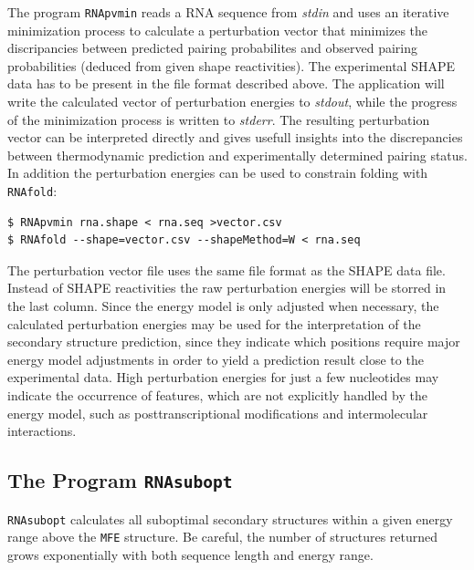 \documentclass[a4paper]{article}
\begin{document}
The program \texttt{RNApvmin} reads a RNA sequence from \textit{stdin} and uses an iterative minimization
process to calculate a perturbation vector that minimizes the discripancies
between predicted pairing probabilites and observed pairing probabilities
(deduced from given shape reactivities).
The experimental SHAPE data has to be present in the file format described above.
The application will write the calculated vector of perturbation energies to \textit{stdout},
while the progress of the minimization process is written to \textit{stderr}.
The resulting perturbation vector can be interpreted directly and gives usefull insights into the
discrepancies between thermodynamic prediction and experimentally determined pairing status.
In addition the perturbation energies can be used to constrain folding with \texttt{RNAfold}:

\begin{verbatim}
$ RNApvmin rna.shape < rna.seq >vector.csv
$ RNAfold --shape=vector.csv --shapeMethod=W < rna.seq
\end{verbatim}%

The perturbation vector file uses the same file format as the SHAPE data file.
Instead of SHAPE reactivities the raw perturbation energies will be storred in the last column.
Since the energy model is only adjusted when necessary, the calculated perturbation energies may be used
for the interpretation of the secondary structure prediction, since they indicate
which positions require major energy model adjustments in order to yield a prediction
result close to the experimental data. High perturbation energies for just
a few nucleotides may indicate the occurrence of features, which are not explicitly
handled by the energy model, such as posttranscriptional modifications and
intermolecular interactions.

\pagebreak[3]
\subsection{The Program \texttt{RNAsubopt}}
\texttt{RNAsubopt} calculates all suboptimal secondary structures within a
given energy range above the \texttt{MFE} structure. Be careful, the number
of structures returned grows exponentially with both sequence length and
energy range.
\end{document}
